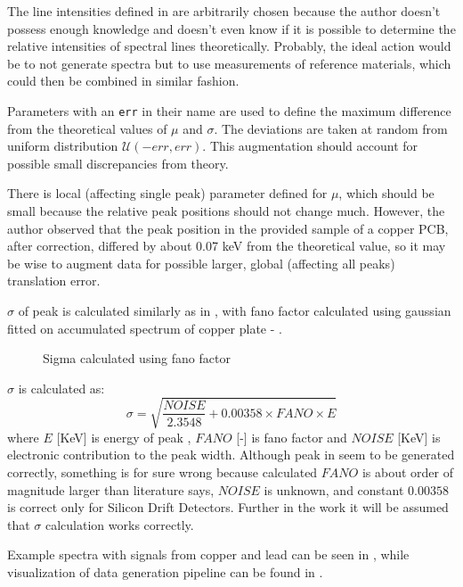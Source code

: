 The line intensities defined in  are arbitrarily chosen because the author doesn't possess enough knowledge and doesn't even know if it is possible to determine the relative intensities of spectral lines theoretically. 
Probably, the ideal action would be to not generate spectra but to use measurements of reference materials, which could then be combined in similar fashion.

Parameters with an \texttt{err} in their name are used to define the maximum difference from the theoretical values of $\mu$ and $\sigma$. 
The deviations are taken at random from uniform distribution $\mathcal{U}(-err, err)$.
This augmentation should account for possible small discrepancies from theory. 

There is local (affecting single peak) parameter defined for $\mu$, which should be small because the relative peak positions should not change much. 
However, the author observed that the peak position in the provided sample of a copper PCB, after correction, differed by about 0.07 keV from the theoretical value, so it may be wise to augment data for possible larger, global (affecting all peaks) translation error.

$\sigma$ of peak is calculated similarly as in \cite{Jones2022}, with fano factor calculated using gaussian fitted on accumulated spectrum of copper plate - .

\begin{figure}[H] 
  \centering     
   
  \caption{Sigma calculated using fano factor}
  \label{fig:fano-factor}
\end{figure}

$\sigma$ is calculated as: \[\sigma = \sqrt{\frac{NOISE}{2.3548} + 0.00358 \times FANO \times E}\]
where $E$ [KeV] is energy of peak , $FANO$ [-] is fano factor and $NOISE$ [KeV] is electronic contribution to the peak width.
Although peak in  seem to be generated correctly, something is for sure wrong because calculated $FANO$ is about order of magnitude larger than literature says, $NOISE$ is unknown, and constant $0.00358$ is correct only for Silicon Drift Detectors.
Further in the work it will be assumed that $\sigma$ calculation works correctly.

Example spectra with signals from copper and lead can be seen in , while visualization of data generation pipeline can be found in .

